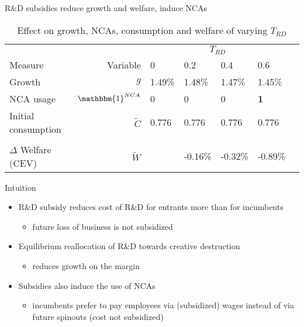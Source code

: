 \documentclass[english,usenames,dvipsnames]{beamer}
\begin{document}
\begin{frame}{R\&D subsidies reduce growth and welfare, induce NCAs}\label{RDsubsidy_table}
		\begin{table}
			\centering
			\scriptsize
			\caption*{Effect on growth, NCAs, consumption and welfare of varying $T_{RD}$}
			\begin{tabular}{lrlllll}
				\toprule \toprule
				 &  & \multicolumn{4}{c}{$T_{RD}$} \tabularnewline
				Measure &Variable & 0 & 0.2 & 0.4 & 0.6 \tabularnewline
				\midrule
				Growth & $g$ & 1.49\% & 1.48\% & 1.47\% & 1.45\% \tabularnewline
				NCA usage & $\mathbbm{1}^{NCA}$ & 0 & 0 & 0 & \alert{\textbf{1}} \tabularnewline
				Initial consumption & $\tilde{C}$  & 0.776 &  0.776 & 0.776 & 0.776 \tabularnewline 
				\tabularnewline
				$\Delta$ Welfare (CEV) & $\tilde{W}$  &  & -0.16\% & -0.32\% & -0.89\% \tabularnewline
				\bottomrule
			\end{tabular}
		\end{table}
		\hyperlink{plots:rd_subsidies}{}
\end{frame}

\begin{frame}{Intuition}
	\begin{itemize}
		\item <+-> R\&D subsidy reduces cost of R\&D for entrants more than for incumbents
		\begin{itemize}
			\item future loss of business is not subsidized
		\end{itemize}
		\medskip
		\item <+-> Equilibrium reallocation of R\&D towards creative destruction
		\begin{itemize}
			\item reduces growth on the margin
		\end{itemize}
		\medskip
		\item <+-> Subsidies also induce the use of NCAs
		\begin{itemize}
			\item incumbents prefer to pay employees via (subsidized) wages instead of via future spinouts (cost not subsidized)
		\end{itemize}
	\end{itemize}
\end{frame}
\end{document}
